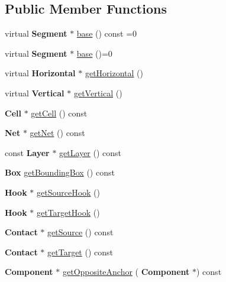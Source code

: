 \subsection*{Public Member Functions}
\begin{DoxyCompactItemize}
\item 
virtual \textbf{ Segment} $\ast$ \mbox{\hyperlink{classKatabatic_1_1AutoSegment_a53877ff5ef48eb0030c2581a6eeb3c09}{base}} () const =0
\item 
virtual \textbf{ Segment} $\ast$ \mbox{\hyperlink{classKatabatic_1_1AutoSegment_ade416d0483aefe986988fa89a7cf6fcf}{base}} ()=0
\item 
virtual \textbf{ Horizontal} $\ast$ \mbox{\hyperlink{classKatabatic_1_1AutoSegment_a659b8ed90de679564924afe07af478de}{get\+Horizontal}} ()
\item 
virtual \textbf{ Vertical} $\ast$ \mbox{\hyperlink{classKatabatic_1_1AutoSegment_ab6a809b6f3ef3cf5385fa35580e31e7a}{get\+Vertical}} ()
\item 
\textbf{ Cell} $\ast$ \mbox{\hyperlink{classKatabatic_1_1AutoSegment_a55a3a88610ef1af9931e634f77f2403b}{get\+Cell}} () const
\item 
\textbf{ Net} $\ast$ \mbox{\hyperlink{classKatabatic_1_1AutoSegment_a692492374623a5c6096b2c4a51190359}{get\+Net}} () const
\item 
const \textbf{ Layer} $\ast$ \mbox{\hyperlink{classKatabatic_1_1AutoSegment_ab045567c4f529dca7790d66c17c3084f}{get\+Layer}} () const
\item 
\textbf{ Box} \mbox{\hyperlink{classKatabatic_1_1AutoSegment_a63a3ab1e6501bbad68b9efd4998e48c0}{get\+Bounding\+Box}} () const
\item 
\textbf{ Hook} $\ast$ \mbox{\hyperlink{classKatabatic_1_1AutoSegment_a1defbbaef0a1975993e157a8d5f68ded}{get\+Source\+Hook}} ()
\item 
\textbf{ Hook} $\ast$ \mbox{\hyperlink{classKatabatic_1_1AutoSegment_ad62048f68151e5db987b5a7c79cce4ed}{get\+Target\+Hook}} ()
\item 
\textbf{ Contact} $\ast$ \mbox{\hyperlink{classKatabatic_1_1AutoSegment_a497ea2ceeddb939dbc84eae0e7862335}{get\+Source}} () const
\item 
\textbf{ Contact} $\ast$ \mbox{\hyperlink{classKatabatic_1_1AutoSegment_a0862c201bd7d8e5427e44ca2427c2fe6}{get\+Target}} () const
\item 
\textbf{ Component} $\ast$ \mbox{\hyperlink{classKatabatic_1_1AutoSegment_a9216d4467c2d4e0c7b9d9a8b8e798bee}{get\+Opposite\+Anchor}} (\textbf{ Component} $\ast$) const

\end{DoxyCompactItemize}
